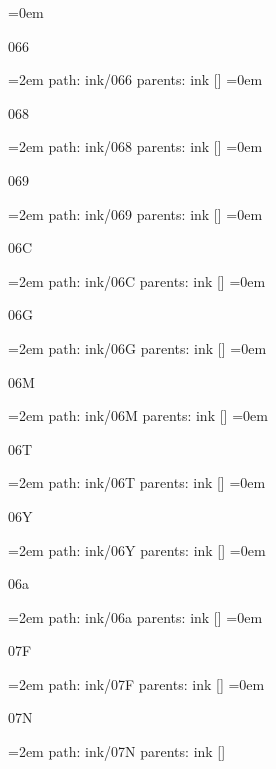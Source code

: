 \smallskip
\leftskip=0em
\par\endgroup
\bigskip
{}
066
\smallskip
\par\begingroup
\leftskip=2em
path: ink/066
\smallskip
parents:  ink []
\smallskip
\leftskip=0em
\par\endgroup
\bigskip
{}
068
\smallskip
\par\begingroup
\leftskip=2em
path: ink/068
\smallskip
parents:  ink []
\smallskip
\leftskip=0em
\par\endgroup
\bigskip
{}
069
\smallskip
\par\begingroup
\leftskip=2em
path: ink/069
\smallskip
parents:  ink []
\smallskip
\leftskip=0em
\par\endgroup
\bigskip
{}
06C
\smallskip
\par\begingroup
\leftskip=2em
path: ink/06C
\smallskip
parents:  ink []
\smallskip
\leftskip=0em
\par\endgroup
\bigskip
{}
06G
\smallskip
\par\begingroup
\leftskip=2em
path: ink/06G
\smallskip
parents:  ink []
\smallskip
\leftskip=0em
\par\endgroup
\bigskip
{}
06M
\smallskip
\par\begingroup
\leftskip=2em
path: ink/06M
\smallskip
parents:  ink []
\smallskip
\leftskip=0em
\par\endgroup
\bigskip
{}
06T
\smallskip
\par\begingroup
\leftskip=2em
path: ink/06T
\smallskip
parents:  ink []
\smallskip
\leftskip=0em
\par\endgroup
\bigskip
{}
06Y
\smallskip
\par\begingroup
\leftskip=2em
path: ink/06Y
\smallskip
parents:  ink []
\smallskip
\leftskip=0em
\par\endgroup
\bigskip
{}
06a
\smallskip
\par\begingroup
\leftskip=2em
path: ink/06a
\smallskip
parents:  ink []
\smallskip
\leftskip=0em
\par\endgroup
\bigskip
{}
07F
\smallskip
\par\begingroup
\leftskip=2em
path: ink/07F
\smallskip
parents:  ink []
\smallskip
\leftskip=0em
\par\endgroup
\bigskip
{}
07N
\smallskip
\par\begingroup
\leftskip=2em
path: ink/07N
\smallskip
parents:  ink []

